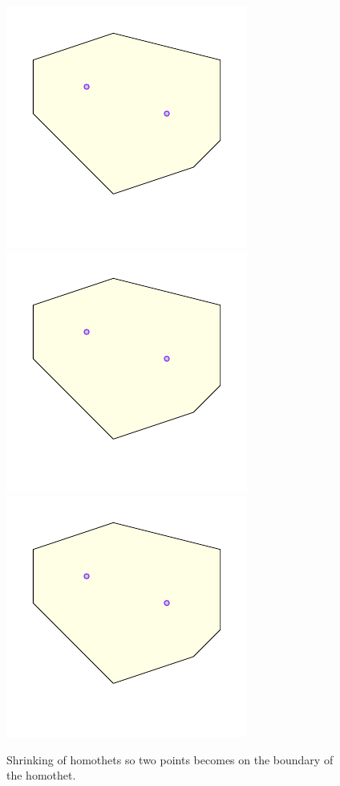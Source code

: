 \documentclass[12pt]{article}%
\begin{document}
\begin{figure}[h]
    \includegraphics[page=1]{figs/shrink_2}%
    \hfill%
    \includegraphics[page=2]{figs/shrink_2}%
    \hfill%
    \includegraphics[page=3]{figs/shrink_2}
    \caption{Shrinking of homothets so two points becomes on the
       boundary of the homothet.}
\end{figure}
\end{document}
